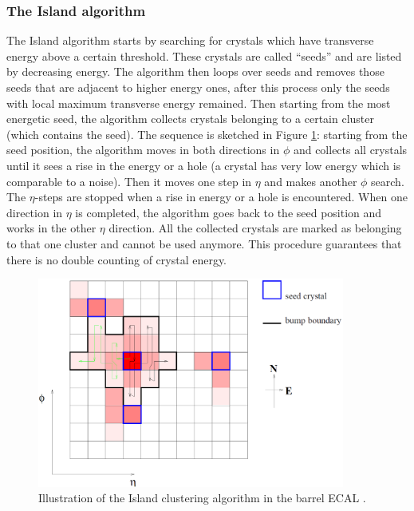 \subsubsection*{The Island algorithm}\label{subsubsec:Island}

The Island algorithm starts by searching for crystals which have transverse energy above a certain threshold. These crystals are called ``seeds'' and are listed by decreasing energy. The algorithm then loops over seeds and removes those seeds that are adjacent to higher energy ones, after this process only the seeds with local maximum transverse energy remained. Then starting from the most energetic seed, the algorithm collects crystals belonging to a certain cluster (which contains the seed). The sequence is sketched in Figure \ref{fig:Cluster_Island}: starting from the seed position, the algorithm moves in both directions in $\phi$ and collects all crystals until it sees a rise in the energy or a hole (a crystal has very low energy which is comparable to a noise). Then it moves one step in $\eta$ and makes another $\phi$ search. The $\eta$-steps are stopped when a rise in energy or a hole is encountered. When one direction in $\eta$ is completed, the algorithm goes back to the seed position and works in the other $\eta$ direction. All the collected crystals are marked as belonging to that one cluster and cannot be used anymore. This procedure guarantees that there is no double counting of crystal energy.

\begin{figure}[h!]
\begin{center}
\includegraphics[width=0.9\textwidth]{figures/Reconstruction/Electron_photon/Island.png}
\caption{Illustration of the Island clustering algorithm in the barrel ECAL \cite{CMS-Note-2001-034}.}
\label{fig:Cluster_Island}
\end{center}
\end{figure}

